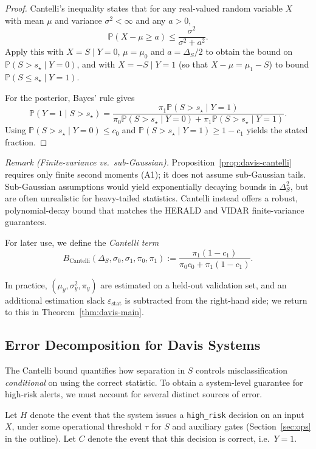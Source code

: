 \documentclass[11pt]{article}
\newcommand{\Prob}{\mathbb{P}}
\begin{document}
\begin{proof}
Cantelli’s inequality states that for any real-valued random variable $X$ with mean $\mu$ and
variance $\sigma^2<\infty$ and any $a>0$,
\[
\Prob(X-\mu \ge a) \le \frac{\sigma^2}{\sigma^2 + a^2}.
\]
Apply this with $X=S\mid Y=0$, $\mu=\mu_0$ and $a=\Delta_S/2$ to obtain the bound on
$\Prob(S>s_\star\mid Y=0)$, and with $X=-S\mid Y=1$ (so that $X-\mu = \mu_1-S$) to bound
$\Prob(S\le s_\star\mid Y=1)$.

For the posterior, Bayes’ rule gives
\[
\Prob(Y=1 \mid S > s_\star) =
\frac{\pi_1 \Prob(S > s_\star \mid Y=1)}
     {\pi_0 \Prob(S > s_\star \mid Y=0) +
      \pi_1 \Prob(S > s_\star \mid Y=1)}.
\]
Using $\Prob(S > s_\star \mid Y=0) \le c_0$ and
$\Prob(S > s_\star \mid Y=1) \ge 1 - c_1$ yields the stated fraction.
\end{proof}

\noindent\emph{Remark (Finite-variance vs.\ sub-Gaussian).} Proposition~\ref{prop:davis-cantelli}
requires only finite second moments (A1); it does not assume sub-Gaussian tails. Sub-Gaussian
assumptions would yield exponentially decaying bounds in $\Delta_S^2$, but are often unrealistic
for heavy-tailed statistics. Cantelli instead offers a robust, polynomial-decay bound that matches
the HERALD and VIDAR finite-variance guarantees.

For later use, we define the \emph{Cantelli term}
\[
B_{\mathrm{Cantelli}}(\Delta_S,\sigma_0,\sigma_1,\pi_0,\pi_1)
:= \frac{\pi_1 (1-c_1)}{\pi_0 c_0 + \pi_1 (1-c_1)}.
\]

In practice, $(\mu_y,\sigma_y^2,\pi_y)$ are estimated on a held-out validation set, and an
additional estimation slack $\varepsilon_{\mathrm{stat}}$ is subtracted from the right-hand side; we
return to this in Theorem~\ref{thm:davis-main}.

\subsection{Error Decomposition for Davis Systems}

The Cantelli bound quantifies how separation in $S$ controls misclassification \emph{conditional} on
using the correct statistic. To obtain a system-level guarantee for high-risk alerts, we must account
for several distinct sources of error.

Let $H$ denote the event that the system issues a \texttt{high\_risk} decision on an input $X$,
under some operational threshold $\tau$ for $S$ and auxiliary gates (Section~\ref{sec:ops} in the
outline). Let $C$ denote the event that this decision is correct, i.e.\ $Y=1$.
\end{document}
